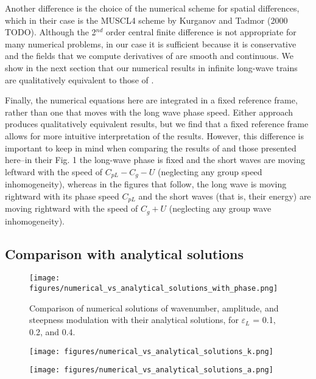 \documentclass[lineno]{jfm}
\begin{document}
Another difference is the choice of the numerical scheme for spatial differences,
which in their case is the MUSCL4 scheme by Kurganov and Tadmor (2000 TODO).
Although the 2$^{nd}$ order central finite difference is not appropriate for many
numerical problems, in our case it is sufficient because it is conservative and
the fields that we compute derivatives of are smooth and continuous.
We show in the next section that our numerical results in infinite long-wave
trains are qualitatively equivalent to those of \citet{peureux2021unsteady}.

Finally, the numerical equations here are integrated in a fixed reference frame,
rather than one that moves with the long wave phase speed.
Either approach produces qualitatively equivalent results, but we find that
a fixed reference frame allows for more intuitive interpretation of the results.
However, this difference is important to keep in mind when comparing the results
of \citet{peureux2021unsteady} and those presented here--in their Fig. 1 the
long-wave phase is fixed and the short waves are moving leftward
with the speed of $C_{pL} - C_g - U$ (neglecting any group speed inhomogeneity),
whereas in the figures that follow, the long wave is moving rightward with its
phase speed $C_{pL}$ and the short waves (that is, their energy) are moving
rightward with the speed of $C_g + U$ (neglecting any group wave inhomogeneity).

\subsection{Comparison with analytical solutions}
\label{subsection:comparison_with_analytical_solutions}

\begin{figure}
\centering
\texttt{[image: figures/numerical\_vs\_analytical\_solutions\_with\_phase.png]}
\caption{
  Comparison of numerical solutions of wavenumber, amplitude, and steepness modulation
  with their analytical solutions, for $\varepsilon_L$ = 0.1, 0.2, and 0.4.
}
\label{fig:numerical_solutions}
\end{figure}

\begin{figure}
\centering
\texttt{[image: figures/numerical\_vs\_analytical\_solutions\_k.png]}
\caption{}
\label{fig:numerical_vs_analytical_k}
\end{figure}

\begin{figure}
\centering
\texttt{[image: figures/numerical\_vs\_analytical\_solutions\_a.png]}
\caption{}
\label{fig:numerical_vs_analytical_a}
\end{figure}
\end{document}
